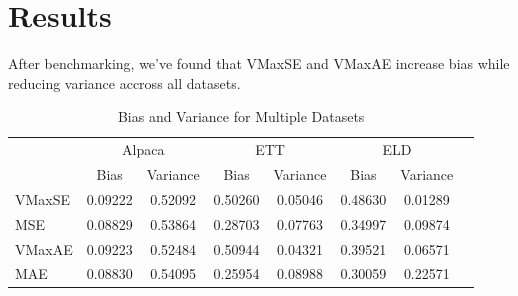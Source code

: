\documentclass{article}
\begin{document}
\section{Results}

After benchmarking, we've found that VMaxSE and VMaxAE increase bias while reducing variance accross all datasets.

\begin{table}[htbp]
  \centering
  \caption{Bias and Variance for Multiple Datasets}
  \label{tab:dataset_metrics}
  \begin{tabular}{lccccccc}
    \toprule
    & \multicolumn{2}{c}{Alpaca} & \multicolumn{2}{c}{ETT} & \multicolumn{2}{c}{ELD} \\
    \cmidrule(lr){2-7}
    & Bias & Variance & Bias & Variance & Bias & Variance \\
    \midrule
    VMaxSE  & 0.09222 & 0.52092  & 0.50260 & 0.05046  & 0.48630 & 0.01289 \\
    MSE     & 0.08829 & 0.53864  & 0.28703 & 0.07763  & 0.34997 & 0.09874 \\
    VMaxAE  & 0.09223 & 0.52484  & 0.50944 & 0.04321  & 0.39521 & 0.06571 \\
    MAE     & 0.08830 & 0.54095  & 0.25954 & 0.08988  & 0.30059 & 0.22571 \\
    \bottomrule
  \end{tabular}
\end{table}
\end{document}
